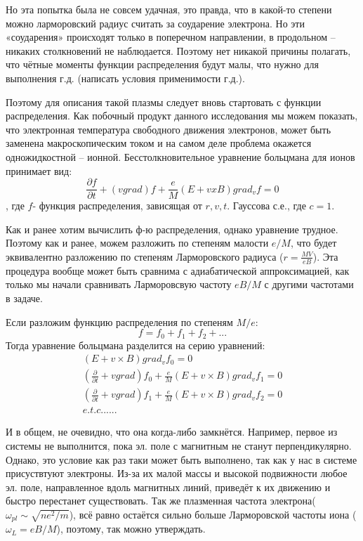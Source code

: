 \documentclass[10pt, a4paper]{article}
\begin{document}
Но эта попытка была не совсем удачная, это правда, что в какой-то степени можно ларморовский радиус считать за соударение электрона. Но эти «соударения» происходят только в поперечном направлении, в продольном – никаких столкновений не наблюдается. Поэтому нет никакой причины полагать, что чётные моменты функции распределения будут малы, что нужно для выполнения г.д. (написать условия применимости г.д.).

Поэтому для описания такой плазмы следует вновь стартовать с функции распределения. Как побочный продукт данного исследования мы можем показать, что электронная температура свободного движения электронов, может быть заменена макроскопическим током и на самом деле проблема окажется одножидкостной – ионной.
Бесстолкновительное уравнение больцмана для ионов принимает вид:
\begin{equation}
	\frac{\partial f}{\partial t}+(v grad)f+ \frac{e}{M}(E+v x B)grad_v  f=0 
\end{equation}
, где $f$- функция распределения, зависящая от $r,v,t$. Гауссова с.е., где $c=1$. 


Как и ранее хотим вычислить ф-ю распределения, однако уравнение трудное. Поэтому как и ранее, можем разложить по степеням малости $e/M$, что будет эквивалентно разложению по степеням Ларморовского радиуса ($r=\frac{MV}{eB}$). Эта процедура вообще может быть сравнима с адиабатической аппроксимацией, как только мы начали сравнивать Ларморовсвую частоту $eB/M$ с другими частотами в задаче.

Если разложим функцию распределения по степеням $M/e$:
\begin{equation}
	f=f_0 + f_1 +f_2+ ...
\end{equation}
Тогда уравнение больцмана разделится на серию уравнений:
\begin{align*}
	(E+v \times B) grad_v f_0 =0 \\
	(\frac{\partial }{\partial t} + v grad) f_0 + \frac{e}{M}(E+v \times B) grad_v f_1  =0 \\
	(\frac{\partial }{\partial t} + v grad) f_1 + \frac{e}{M}(E+v \times B) grad_v f_2  =0 \\
	e.t.c. .....
\end{align*}

И в общем, не очевидно, что она когда-либо замкнётся. Например, первое из системы не выполнится, пока эл. поле с магнитным не станут перпендикулярно. Однако, это условие как раз таки может быть выполнено, так как у нас в системе присуствтуют электроны. Из-за их малой массы и высокой подвижности любое эл. поле, направленное вдоль магнитных линий, приведёт к их движению и быстро перестанет существовать. Так же плазменная частота электрона($\omega_{pl} \sim \sqrt{ne^2/m}$), всё равно остаётся сильно больше Ларморовской частоты иона ($\omega_{L}=eB/M$), поэтому, так можно утверждать.
\end{document}
